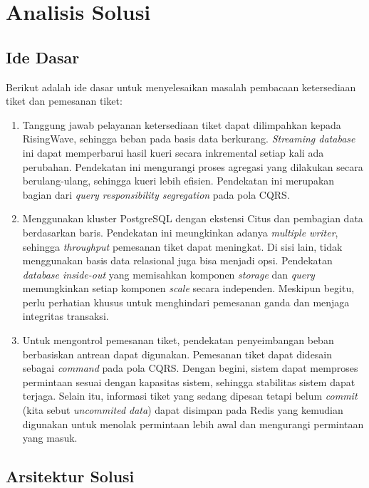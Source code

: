 \section{Analisis Solusi}

\subsection{Ide Dasar}

Berikut adalah ide dasar untuk menyelesaikan masalah pembacaan ketersediaan tiket dan pemesanan tiket:

\begin{enumerate}
  \item Tanggung jawab pelayanan ketersediaan tiket dapat dilimpahkan kepada RisingWave, sehingga beban pada basis data berkurang. \textit{Streaming database} ini dapat memperbarui hasil kueri secara inkremental setiap kali ada perubahan. Pendekatan ini mengurangi proses agregasi yang dilakukan secara berulang-ulang, sehingga kueri lebih efisien. Pendekatan ini merupakan bagian dari \textit{query responsibility segregation} pada pola CQRS.
  \item Menggunakan kluster PostgreSQL dengan ekstensi Citus dan pembagian data berdasarkan baris. Pendekatan ini meungkinkan adanya \textit{multiple writer}, sehingga \textit{throughput} pemesanan tiket dapat meningkat. Di sisi lain, tidak menggunakan basis data relasional juga bisa menjadi opsi. Pendekatan \textit{database inside-out} yang memisahkan komponen \textit{storage} dan \textit{query} memungkinkan setiap komponen \textit{scale} secara independen. Meskipun begitu, perlu perhatian khusus untuk menghindari pemesanan ganda dan menjaga integritas transaksi.
  \item Untuk mengontrol pemesanan tiket, pendekatan penyeimbangan beban berbasiskan antrean dapat digunakan. Pemesanan tiket dapat didesain sebagai \textit{command} pada pola CQRS. Dengan begini, sistem dapat memproses permintaan sesuai dengan kapasitas sistem, sehingga stabilitas sistem dapat terjaga. Selain itu, informasi tiket yang sedang dipesan tetapi belum \textit{commit} (kita sebut \textit{uncommited data}) dapat disimpan pada Redis yang kemudian digunakan untuk menolak permintaan lebih awal dan mengurangi permintaan yang masuk.
\end{enumerate}

\subsection{Arsitektur Solusi}

